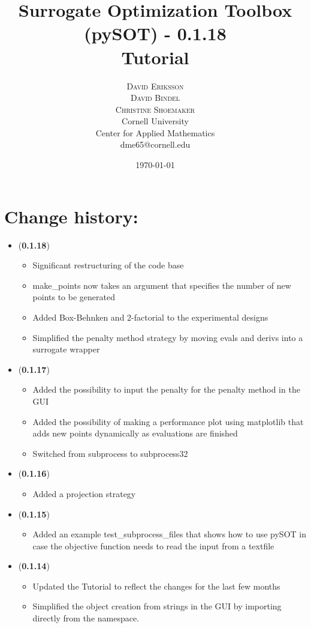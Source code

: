 \documentclass[]{article}
\title{\vspace{-15mm}%
	\fontsize{18pt}{10pt}\selectfont
	\textbf{Surrogate Optimization Toolbox (pySOT) - 0.1.18 \\ Tutorial}
	}
\author{%
	\Large\textsc{David Eriksson} \\[2mm]
	\Large\textsc{David Bindel} \\[2mm]
	\Large\textsc{Christine Shoemaker} \\[2mm]
		\normalsize	Cornell University \\
	\normalsize Center for Applied Mathematics \\
	\normalsize	dme65@cornell.edu \\ 
	}
\date{\today}
\begin{document}
\fontsize{12}{14}\rm

\maketitle
\thispagestyle{fancy}
\tableofcontents
\newpage

\section{Change history:}
\begin{itemize}

\item (\textbf{0.1.18})
\begin{itemize}
\item Significant restructuring of the code base
\item make\_points now takes an argument that specifies the number of new points to be generated
\item Added Box-Behnken and 2-factorial to the experimental designs
\item Simplified the penalty method strategy by moving evals and derivs into a surrogate wrapper
\end{itemize}

\item (\textbf{0.1.17})
\begin{itemize}
\item Added the possibility to input the penalty for the penalty method in the GUI
\item Added the possibility of making a performance plot using matplotlib that adds new points dynamically as evaluations are finished
\item Switched from subprocess to subprocess32
\end{itemize}

\item (\textbf{0.1.16})
\begin{itemize}
\item Added a projection strategy
\end{itemize}

\item (\textbf{0.1.15})
\begin{itemize}
\item Added an example test\_subprocess\_files that shows how to use pySOT in case the objective function needs to read the input from a textfile
\end{itemize}

\item (\textbf{0.1.14}) 
\begin{itemize}
\item Updated the Tutorial to reflect the changes for the last few months
\item Simplified the object creation from strings in the GUI by importing directly from the namespace.
\end{itemize}


\end{itemize}
\end{document}
